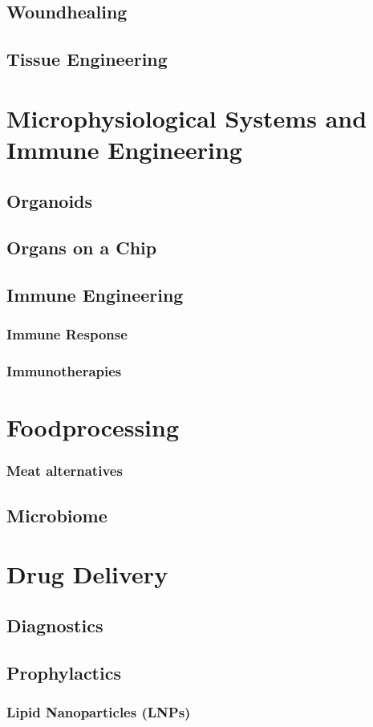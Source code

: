 \documentclass[12pt]{cheatsheet}
\begin{document}
\subsection*{Woundhealing}

\subsection*{Tissue Engineering}


\section*{Microphysiological Systems and Immune Engineering}
\subsection*{Organoids}

\subsection*{Organs on a Chip}

\subsection*{Immune Engineering}

\subsubsection*{Immune Response}

\subsubsection*{Immunotherapies}


\section*{Foodprocessing}

\subsubsection*{Meat alternatives}

\subsection*{Microbiome}


\section*{Drug Delivery}
\subsection*{Diagnostics}

\subsection*{Prophylactics}

\subsubsection*{Lipid Nanoparticles (LNPs)}


\vfill \null \columnbreak
\end{document}
